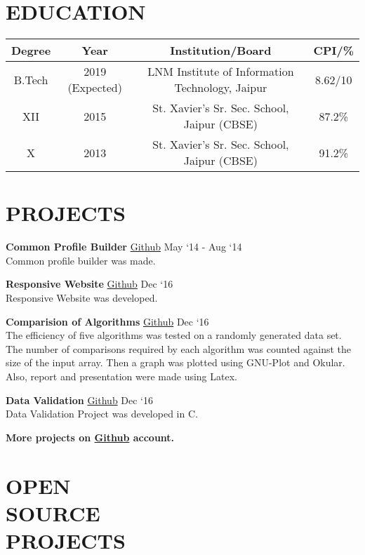 \documentclass[margin]{res}
\begin{document}
\begin{resume}

\section{EDUCATION}

\begin{tabular}{|c|c|c|c|}

\hline
\textbf{Degree} & \textbf{Year} & {Institution/Board} & {CPI/\%} \\
\hline
B.Tech & 2019 (Expected) & LNM Institute of Information Technology, Jaipur & 8.62/10 \\
\hline
XII & 2015 & St. Xavier’s Sr. Sec. School, Jaipur (CBSE) & 87.2\% \\
\hline
X & 2013 & St. Xavier’s Sr. Sec. School, Jaipur (CBSE) & 91.2\% \\
\hline
\end{tabular}

\section{PROJECTS}

  {\textbf{Common Profile Builder}} \href{https://github.com/karanagarwal17/web_scrapper_nodejs}{Github} \hfill May `14 - Aug `14\\
  Common profile builder was made.

  {\textbf{Responsive Website}} \href{https://github.com/karanagarwal17/responsive-web-project}{Github} \hfill Dec `16\\
  Responsive Website was developed.

  {\textbf{Comparision of Algorithms}} \href{https://github.com/karanagarwal17/comparision-of-algorithms}{Github} \hfill Dec `16\\
  The efficiency of five algorithms was tested on a randomly generated data set. The number of comparisons required by each algorithm was counted against the size of the input array. Then a graph was plotted using GNU-Plot and Okular. Also, report and presentation were made using Latex.

  {\textbf{Data Validation}} \href{https://github.com/karanagarwal17/Data-Validation}{Github} \hfill Dec `16\\
  Data Validation Project was developed in C.

  \textbf{More projects on \href{https://github.com/karanagarwal17}{Github} account.}

  \section{OPEN \\SOURCE \\ PROJECTS}


\end{resume}
\end{document}

